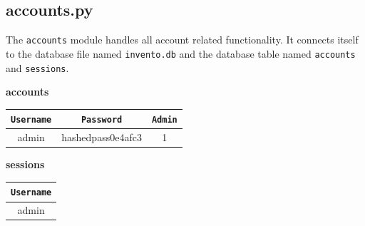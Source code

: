 \documentclass[12pt,a4paper]{article}
\renewcommand{\indent}{\hspace\parindent}
\begin{document}
        \subsection*{\normalfont{\faCode{}} \textbf{accounts.py}}

        \indent The \texttt{accounts} module handles all account related 
        functionality. It connects itself to the database file named \texttt{invento.db} 
        and the database table named \texttt{accounts} and \texttt{sessions}. 

        \begin{multicols}{2}
        \begin{center}
            \textbf{accounts}\vspace{5pt}

            \begin{tabular}{| c | c | c |}
                \hline
                \texttt{Username} & \texttt{Password} & \texttt{Admin}\\
                \hline
                admin & hashedpass0e4afc3 & 1\\
                \hline
            \end{tabular}

            \textbf{sessions}\vspace{5pt}

            \begin{tabular}{| c |}
                \hline
                \texttt{Username}\\
                \hline
                admin\\
                \hline
            \end{tabular}
        \end{center}
        \end{multicols}

        \hfill{}
\end{document}
